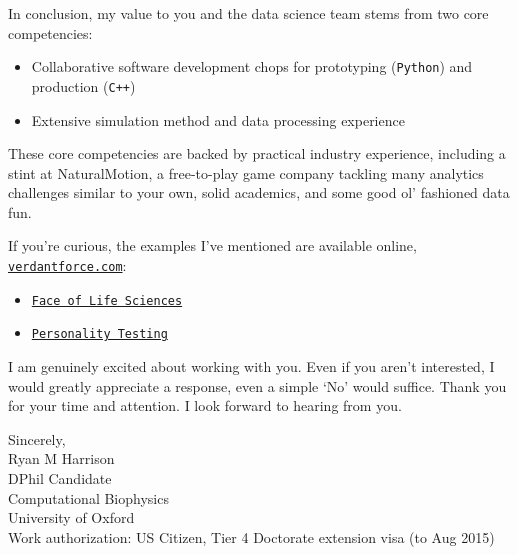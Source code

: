 \documentclass{../res}
\begin{document}
\begin{sloppypar}
\begin{resume}
In conclusion, my value to you and the data science team stems from two core competencies: 
\begin{itemize}[itemindent=1cm]
    \item Collaborative software development chops for prototyping (\texttt{Python}) and production (\texttt{C++})
    \item Extensive simulation method and data processing experience
\end{itemize}
These core competencies are backed by practical industry experience, including a stint at NaturalMotion, a free-to-play game company tackling many analytics challenges similar to your own, solid academics, and some good ol' fashioned data fun.

If you're curious, the examples I've mentioned are available online, \href{http://www.verdantforce.com}{\nolinkurl{verdantforce.com}}:
\begin{itemize}[itemindent=1cm]
    \item \href{http://www.verdantforce.com/2012/05/infographic-face-of-life-science}{\nolinkurl{Face of Life Sciences}}
    \item \href{http://www.verdantforce.com/2014/04/data-science-personality-testing}{\nolinkurl{Personality Testing}}
\end{itemize}

I am genuinely excited about working with you. Even if you aren't interested, I would greatly appreciate a response, even a simple `No' would suffice. Thank you for your time and attention. I look forward to hearing from you.

Sincerely, \\
Ryan M Harrison \\ 
DPhil Candidate \\
Computational Biophysics \\
University of Oxford  \\
Work authorization: US Citizen, Tier 4 Doctorate extension visa (to Aug 2015)
\end{resume} 
\end{sloppypar}
\end{document}

